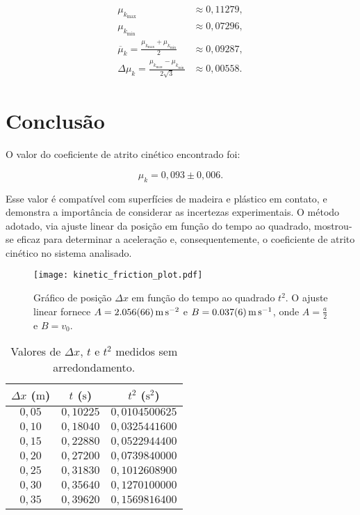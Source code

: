 \documentclass[10pt,oneside,twocolumn,a4paper]{article}
\begin{document}
\begin{align*}
	\mu_{k_\text{max}} &\approx 0,11279, \\
	\mu_{k_\text{min}} &\approx 0,07296, \\
	\overline\mu_k = \frac{\mu_{k_\text{max}} + \mu_{k_\text{min}}}{2} &\approx 0,09287, \\
	\Delta\mu_k = \frac{\mu_{k_\text{max}} - \mu_{k_\text{min}}}{2\sqrt{3}} &\approx 0,00558.
\end{align*}

\section{Conclusão}

O valor do coeficiente de atrito cinético encontrado foi:

\begin{equation*}
	\mu_k = 0,093 \pm 0,006.
\end{equation*}

Esse valor é compatível com superfícies de madeira e plástico em contato, e
demonstra a importância de considerar as incertezas experimentais. O método
adotado, via ajuste linear da posição em função do tempo ao quadrado,
mostrou-se eficaz para determinar a aceleração e, consequentemente, o
coeficiente de atrito cinético no sistema analisado.


\onecolumn

\begin{figure}[p]
		\texttt{[image: kinetic\_friction\_plot.pdf]}
		\caption{
			Gráfico de posição $\Delta x$ em função do tempo ao quadrado $t^2$.
			O ajuste linear fornece $A = \SI{2,056 \pm
			0,066}{\metre\per\second\squared}$ e $B = \SI{0,037 \pm
			0,006}{\metre\per\second}$, onde $A = \frac{a}{2}$ e $B = v_0$.
		}
		\label{fig:kinetic_friction}
\end{figure}

\begin{table}[p]
	\centering
		\begin{tabular}{|| c | c | c ||}
		\hline
		$\Delta x$ ($\si{\metre}$) & $t$ ($\si{\second}$) & $t^2$ ($\si{\second^2}$) \\
		\hline\hline
		$0,05$ & $0,10225$ & $0,0104500625$ \\
		$0,10$ & $0,18040$ & $0,0325441600$ \\
		$0,15$ & $0,22880$ & $0,0522944400$ \\
		$0,20$ & $0,27200$ & $0,0739840000$ \\
		$0,25$ & $0,31830$ & $0,1012608900$ \\
		$0,30$ & $0,35640$ & $0,1270100000$ \\
		$0,35$ & $0,39620$ & $0,1569816400$ \\
		\hline
	\end{tabular}
	\caption{Valores de $\Delta x$, $t$ e $t^2$ medidos sem arredondamento.}
	\label{tbl:dados}
\end{table}
\end{document}
